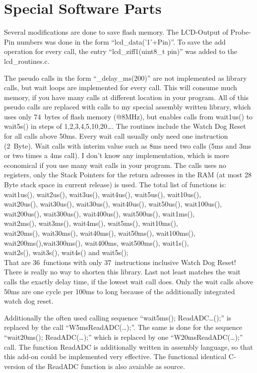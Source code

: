 
\chapter{Special Software Parts}

Several modifications are done to save flash memory.
The LCD-Output of Probe-Pin numbers was done in the form ``lcd\_data('1'+Pin)''.
To save the add operation for every call, the entry ``lcd\_ziff1(uint8\_t pin)''
was added to the lcd\_routines.c.


The pseudo calls in the form ``\_delay\_ms(200)'' are not implemented as library calls,
but wait loops are implemented for every call. This will consume much memory, if you
have many calls at different location in your program.
All of this pseudo calls are replaced with calls to my special assembly written library,
which uses only 74~bytes of flash memory (@8MHz), but enables calls from wait1us() to wait5s()
in steps of 1,2,3,4,5,10,20\dots . The routines  include the Watch Dog Reset for all calls
above 50ms. Every wait call usually only need one instruction (2~Byte). Wait calls
with interim value such as 8ms need two calls (5ms and 3ms or two times a 4ms call).
I don't know any implementation, which is more economical if you use many wait calls in your program.
The calls uses no registers, only the Stack Pointers for the return adresses
in the RAM (at most 28 Byte stack space in current release) is used.
The total list of functions is:\\
wait1us(), wait2us(), wait3us(), wait4us(), wait5us(), wait10us(), \\
wait20us(), wait30us(), wait30us(), wait40us(), wait50us(), wait100us(), \\
wait200us(), wait300us(), wait400us(), wait500us(), wait1ms(),\\
wait2ms(), wait3ms(), wait4ms(), wait5ms(), wait10ms(),\\
wait20ms(), wait30ms(), wait40ms(), wait50ms(), wait100ms(),\\
wait200ms(),wait300ms(), wait400ms, wait500ms(), wait1s(),\\
wait2s(), wait3s(), wait4s() and wait5s();\\
That are 36~functions with only 37~instructions inclusive Watch Dog Reset!
There is really no way to shorten this library.
Last not least matches the wait calls the exactly delay time, if the lowest wait call does.
Only the wait calls above 50ms are one cycle per 100ms to long because of the additionally integrated watch dog reset.


Additionally the often used calling sequence ``wait5ms(); ReadADC\dots();'' is replaced by the call
``W5msReadADC(\dots);''.
The same is done for the sequence ``wait20ms(); ReadADC(\dots);'' which is replaced by one 
``W20msReadADC(\dots);'' call.
The function ReadADC is additionally written in assembly language, so that this add-on could be
implemented very effective. The functional identical C-version of the ReadADC function is
also avaiable as source.
